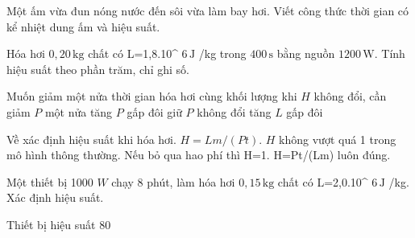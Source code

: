\begin{bt}
Một ấm vừa đun nóng nước đến sôi vừa làm bay hơi. Viết công thức thời gian có kể nhiệt dung ấm và hiệu suất.
\end{bt}

\begin{ex}
Hóa hơi $0,20\,\text{kg}$ chất có L=1,8.10^ $6\,\text{J}$ /kg trong $400\,\text{s}$ bằng nguồn $1200\,\text{W}$. Tính hiệu suất theo phần trăm, chỉ ghi số.
\end{ex}

\begin{ex}
Muốn giảm một nửa thời gian hóa hơi cùng khối lượng khi $H$ không đổi, cần
\choice
{giảm $P$ một nửa}
{\True tăng $P$ gấp đôi}
{giữ $P$ không đổi}
{tăng $L$ gấp đôi}
\end{ex}

\begin{ex}
Về xác định hiệu suất khi hóa hơi.
\choiceTF
{\True $H=Lm/(Pt).$}
{\True $H$ không vượt quá 1 trong mô hình thông thường.}
{\True Nếu bỏ qua hao phí thì H=1.}
{H=Pt/(Lm) luôn đúng.}
\end{ex}

\begin{bt}
Một thiết bị 1000 $W$ chạy 8 phút, làm hóa hơi $0,15\,\text{kg}$ chất có L=2,0.10^ $6\,\text{J}$ /kg. Xác định hiệu suất.
\end{bt}

\begin{ex}
Thiết bị hiệu suất 80%
\end{ex}

